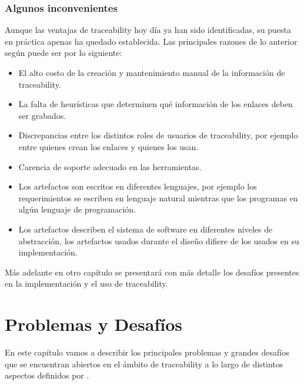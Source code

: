 \documentclass[a4paper,12pt,oneside,spanish]{book}
\begin{document}
\subsection{Algunos inconvenientes}

Aunque las ventajas de traceability hoy día ya han sido identificadas, su puesta en práctica apenas ha quedado establecida. Las principales razones de lo anterior según \cite{GrammelVoigt} puede ser por lo siguiente:

\begin{itemize}

 \item El alto costo de la creación y mantenimiento manual de la información de traceability.

\item La falta de heurísticas que determinen qué información de los enlaces deben ser grabados.

 \item Discrepancias entre los distintos roles de usuarios de traceability, por ejemplo entre quienes crean los enlaces y quienes los usan.

\item Carencia de soporte adecuado en las herramientas.

\item Los artefactos son escritos en diferentes lenguajes, por ejemplo los requerimientos se escriben en lenguaje natural mientras que los programas en algún lenguaje de programación.

\item Los artefactos describen el sistema de software en diferentes niveles de abstracción, los artefactos usados durante el diseño difiere de los usados en su implementación.

\end{itemize}

Más adelante en otro capítulo se presentará con más detalle los desafíos presentes en la implementación y el uso de traceability.




\chapter{Problemas y Desafíos}

En este capítulo vamos a describir los principales problemas y grandes desafíos que se encuentran abiertos en el ámbito de traceability a lo largo de distintos aspectos definidos por \cite{Excellence}.
\end{document}
